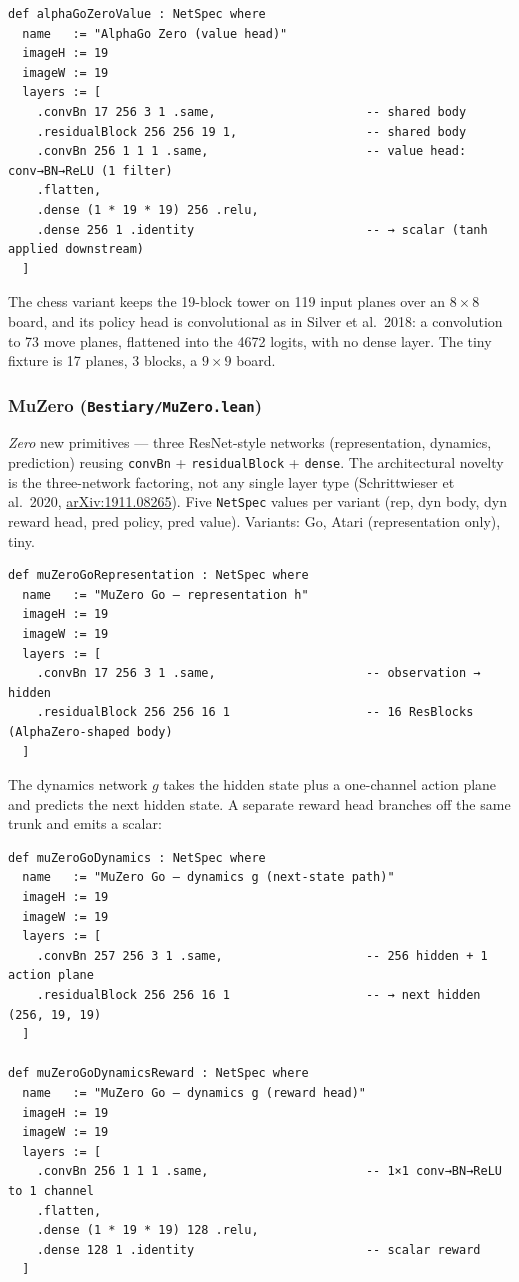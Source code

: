 \begin{verbatim}
def alphaGoZeroValue : NetSpec where
  name   := "AlphaGo Zero (value head)"
  imageH := 19
  imageW := 19
  layers := [
    .convBn 17 256 3 1 .same,                     -- shared body
    .residualBlock 256 256 19 1,                  -- shared body
    .convBn 256 1 1 1 .same,                      -- value head: conv→BN→ReLU (1 filter)
    .flatten,
    .dense (1 * 19 * 19) 256 .relu,
    .dense 256 1 .identity                        -- → scalar (tanh applied downstream)
  ]
\end{verbatim}

The chess variant keeps the 19-block tower on 119 input planes over an
\(8 \times 8\) board, and its policy head is convolutional as in Silver et
al.\ 2018: a convolution to 73 move planes, flattened into the 4672
logits, with no dense layer. The tiny fixture is 17 planes, 3 blocks, a
\(9 \times 9\) board.

\subsubsection*{MuZero (\texttt{Bestiary/MuZero.lean})}
\emph{Zero} new primitives --- three ResNet-style networks (representation,
dynamics, prediction) reusing \texttt{convBn} + \texttt{residualBlock}
+ \texttt{dense}. The architectural novelty is the three-network
factoring, not any single layer type (Schrittwieser et al.\ 2020,
\href{https://arxiv.org/abs/1911.08265}{arXiv:1911.08265}). Five \texttt{NetSpec} values per
variant (rep, dyn body, dyn reward head, pred policy, pred value).
Variants: Go, Atari (representation only), tiny.

\begin{verbatim}
def muZeroGoRepresentation : NetSpec where
  name   := "MuZero Go — representation h"
  imageH := 19
  imageW := 19
  layers := [
    .convBn 17 256 3 1 .same,                     -- observation → hidden
    .residualBlock 256 256 16 1                   -- 16 ResBlocks (AlphaZero-shaped body)
  ]
\end{verbatim}

The dynamics network $g$ takes the hidden state plus a one-channel
action plane and predicts the next hidden state. A separate reward
head branches off the same trunk and emits a scalar:

\begin{verbatim}
def muZeroGoDynamics : NetSpec where
  name   := "MuZero Go — dynamics g (next-state path)"
  imageH := 19
  imageW := 19
  layers := [
    .convBn 257 256 3 1 .same,                    -- 256 hidden + 1 action plane
    .residualBlock 256 256 16 1                   -- → next hidden (256, 19, 19)
  ]

def muZeroGoDynamicsReward : NetSpec where
  name   := "MuZero Go — dynamics g (reward head)"
  imageH := 19
  imageW := 19
  layers := [
    .convBn 256 1 1 1 .same,                      -- 1×1 conv→BN→ReLU to 1 channel
    .flatten,
    .dense (1 * 19 * 19) 128 .relu,
    .dense 128 1 .identity                        -- scalar reward
  ]
\end{verbatim}

